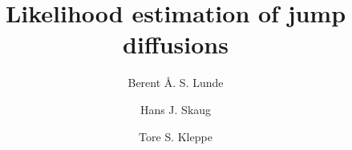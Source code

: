 %
\newcommand{\E}{\ensuremath{\mathbb{E}}}
\newcommand{\Var}{\mathrm{Var}}
\newcommand{\Cov}{\mathrm{Cov}}
\newcommand{\Prob}{\ensuremath{\mathbb{P}}}
\newcommand{\Filtration}{\ensuremath{\mathcal{F}}}
\newcommand{\R}{\ensuremath{\mathbb{R}}}
\newcommand{\Complex}{\ensuremath{\mathbb{C}}}
\newcommand{\Lagr}{\mathcal{L}}
\newcommand{\norm}[1]{\left\lVert#1\right\rVert}
\newcommand{\cutoff}{\varsigma}
\newcommand*\mean[1]{\bar{#1}}
\newcommand{\target}{\ensuremath{r}}
\newcommand{\cRe}{\operatorname{\mathbb{R}e}}
\newcommand{\cIm}{\operatorname{\mathbb{I}e}}
\newtheorem{prop}{Proposition}
%

\newcommand{\euler}{\hat{X}_t^{s1}}
\newcommand{\milstein}{\hat{X}_t^{s2}}
\newcommand{\schemethree}{\hat{X}_t^{s3}}
\newcommand{\spa}{\textt}


%


\title{Likelihood estimation of jump diffusions%
}


\author{Berent Å. S. Lunde         \and
        Hans J. Skaug \and
        Tore S. Kleppe
}



